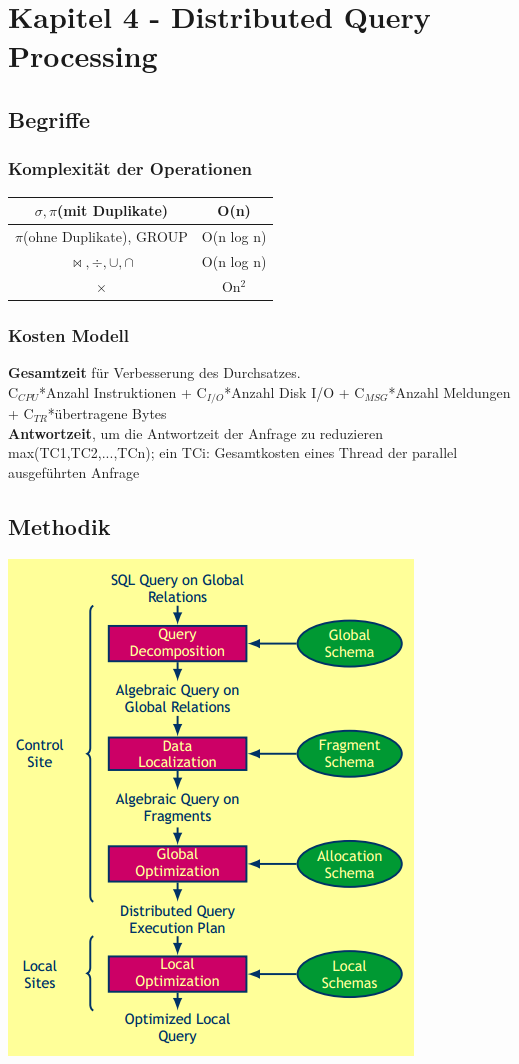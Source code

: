 \documentclass[a4paper,11pt]{article}
\begin{document}
\section{Kapitel 4 - Distributed Query Processing}
\subsection{Begriffe}
\subsubsection{Komplexität der Operationen}
\begin{tabular}{|c|c|}
\hline
$\sigma,\pi$(mit Duplikate) & O(n)\\ \hline
$\pi$(ohne Duplikate), GROUP & O(n log n)\\ \hline
$\bowtie,\div,\cup,\cap$ & O(n log n)\\ \hline
$\times$ & On$^{2}$\\ \hline
\end{tabular}
\subsubsection{Kosten Modell}
\textbf{Gesamtzeit} für Verbesserung des Durchsatzes.\\
C$_{CPU}$*Anzahl Instruktionen + C$_{I/O}$*Anzahl Disk I/O + C$_{MSG}$*Anzahl Meldungen + C$_{TR}$*übertragene Bytes\\
\textbf{Antwortzeit}, um die Antwortzeit der Anfrage zu reduzieren\\
max(TC1,TC2,...,TCn); ein TCi: Gesamtkosten eines Thread der parallel ausgeführten Anfrage
\subsection{Methodik}
\includegraphics[scale=0.7]{src/verteilte_anfrageverarbeitung.png}
\end{document}
